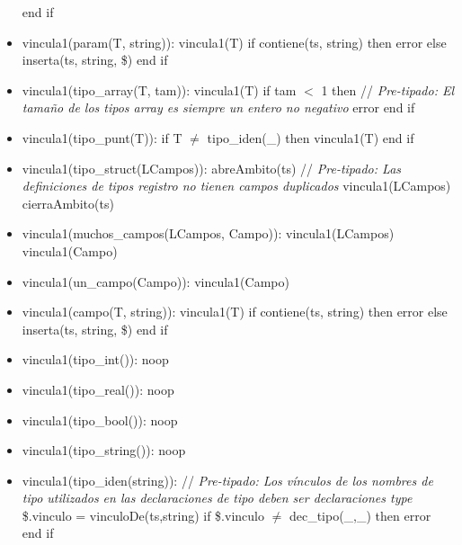 \documentclass[11pt]{article}
\begin{document}
\begin{itemize}
                    \subitem end if
                \item vincula1(param(T, string)): 
                    \subitem vincula1(T) 
                    \subitem if contiene(ts, string) then 
                        \subsubitem error 
                    \subitem else 
                        \subsubitem inserta(ts, string, \$) 
                    \subitem end if
                \item vincula1(tipo\_array(T, tam)): 
                    \subitem vincula1(T) 
                    \subitem if tam $<$ 1 then \/// \textit{Pre-tipado: El tamaño de los tipos array es siempre un entero no negativo}
                        \subsubitem error 
                    \subitem end if
                \item vincula1(tipo\_punt(T)): 
                    \subitem if T $\neq$ tipo\_iden(\_) then 
                        \subsubitem vincula1(T)
                    \subitem end if
                \item vincula1(tipo\_struct(LCampos)): 
                    \subitem abreAmbito(ts)  \/// \textit{Pre-tipado: Las definiciones de tipos registro no tienen campos duplicados}
                    \subitem vincula1(LCampos)
                    \subitem cierraAmbito(ts)
                \item vincula1(muchos\_campos(LCampos, Campo)): 
                    \subitem vincula1(LCampos) 
                    \subitem vincula1(Campo)
                \item vincula1(un\_campo(Campo)): 
                    \subitem vincula1(Campo)
                \item vincula1(campo(T, string)): 
                    \subitem vincula1(T)
                    \subitem if contiene(ts, string) then
                        \subsubitem error
                    \subitem else
                        \subsubitem inserta(ts, string, \$)
                    \subitem end if
                \item vincula1(tipo\_int()): 
                    \subitem noop 
                \item vincula1(tipo\_real()): 
                    \subitem noop
                \item vincula1(tipo\_bool()): 
                    \subitem noop
                \item vincula1(tipo\_string()): 
                    \subitem noop
                \item vincula1(tipo\_iden(string)):  \/// \textit{Pre-tipado: Los vínculos de los nombres de tipo utilizados en las declaraciones de tipo deben ser declaraciones type}                   \subitem \$.vinculo = vinculoDe(ts,string)
                    \subitem if \$.vinculo $\neq$ dec\_tipo(\_,\_) then
                        \subsubitem error
                    \subitem end if
            \end{itemize}
\end{document}
